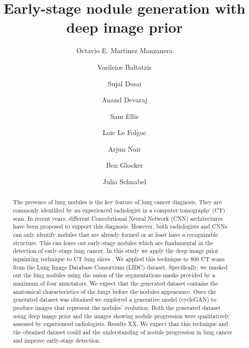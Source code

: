 \documentclass[runningheads]{llncs}
\begin{document}
%
\title{Early-stage nodule generation with deep image prior}
%
%
\author{Octavio E. Martinez Manzanera \and
Vasileios Baltatzis \and
Sujal Desai \and
Anand Devaraj \and
Sam Ellis \and
Loic Le Folgoc \and
Arjun Nair \and
Ben Glocker \and
Julia Schnabel}
%
%
%
\maketitle              %
%
\begin{abstract}
The presence of lung nodules is the key feature of lung cancer diagnosis. They are commonly identified  by an experienced radiologist in a computer tomography (CT) scan. In recent years, different Convolutional Neural Network (CNN) architectures have been proposed to support this diagnosis. However, both radiologists and CNNs can only identify nodules that are already formed or at least have a recognizable structure. This can leave out early-stage nodules which are fundamental in the detection of early-stage lung cancer. In this study we apply the deep image prior inpainting technique to CT lung slices . We applied this technique to 800 CT scans from the Lung Image Database Consortium (LIDC) dataset. Specifically, we masked out the lung nodules using the union of the segmentations masks provided by a maximum of four annotators. We expect that the generated dataset contains the anatomical characteristics of the lungs before the nodules appearance. Once the generated dataset was obtained we employed a generative model (cycleGAN) to produce images that represent the nodules' evolution. Both the generated dataset using deep image prior and the images showing nodule progression were qualitatively assessed by experienced radiologists. Results XX. We expect that this technique and the obtained dataset could aid the understanding of nodule progression in lung cancer and improve early-stage detection.

\end{abstract}
%
%
%
\end{document}
